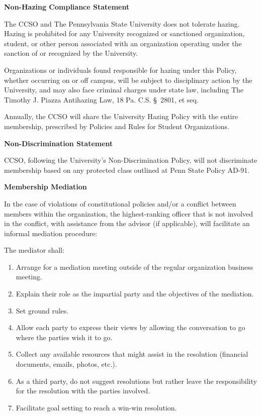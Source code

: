 \documentclass[12pt]{article}
\begin{document}
\textbf{Non-Hazing Compliance Statement}

The CCSO and The Pennsylvania State University does not tolerate hazing. Hazing is prohibited for any University recognized or sanctioned organization, student, or other person associated with an organization operating under the sanction of or recognized by the University.

Organizations or individuals found responsible for hazing under this Policy, whether occurring on or off campus, will be subject to disciplinary action by the University, and may also face criminal charges under state law, including The Timothy J. Piazza Antihazing Law, 18 Pa. C.S. \S~2801, et seq.

Annually, the CCSO will share the University Hazing Policy with the entire membership, prescribed by Policies and Rules for Student Organizations.

\textbf{Non-Discrimination Statement}

CCSO, following the University's Non-Discrimination Policy, will not discriminate membership based on any protected class outlined at Penn State Policy AD-91.

\textbf{Membership Mediation}

In the case of violations of constitutional policies and/or a conflict between members within the organization, the highest-ranking officer that is not involved in the conflict, with assistance from the advisor (if applicable), will facilitate an informal mediation procedure:

The mediator shall:
\begin{enumerate}
  \item Arrange for a mediation meeting outside of the regular organization business meeting.
  \item Explain their role as the impartial party and the objectives of the mediation.
  \item Set ground rules.
  \item Allow each party to express their views by allowing the conversation to go where the parties wish it to go.
  \item Collect any available resources that might assist in the resolution (financial documents, emails, photos, etc.).
  \item As a third party, do not suggest resolutions but rather leave the responsibility for the resolution with the parties involved.
  \item Facilitate goal setting to reach a win-win resolution.
\end{enumerate}
\end{document}
